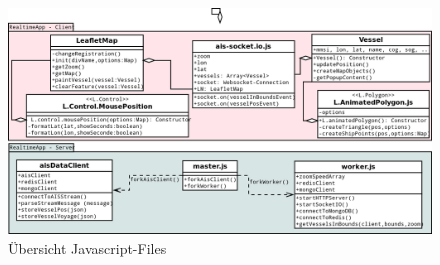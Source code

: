 \begin{figure}[H]
  \centering
  \includegraphics[width=6in]{images/ais-socketio.png}
  \caption[Übersicht Javascript-Files]{Übersicht Javascript-Files}
  \label{fig:Übersicht Javascript-Files}
\end{figure}
